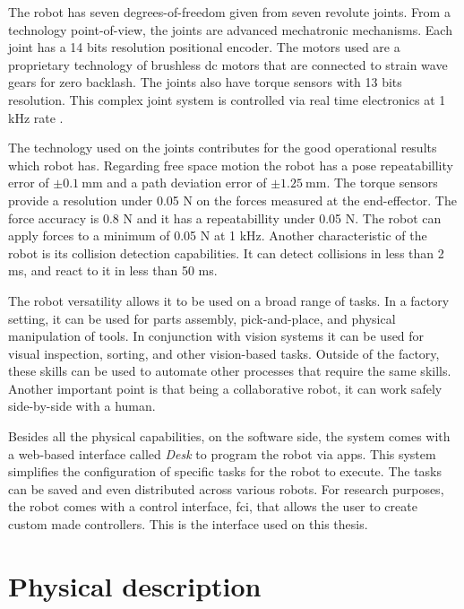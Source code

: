 The robot has seven degrees-of-freedom given from seven revolute joints. From a technology point-of-view, the joints are advanced mechatronic mechanisms. Each joint has a 14 bits resolution positional encoder. The motors used are a proprietary technology of brushless dc motors that are connected to strain wave gears for zero backlash. The joints also have torque sensors with 13 bits resolution. This complex joint system is controlled via real time electronics at 1 kHz rate \cite{FrankaEmikaGmbH_technology}.

The technology used on the joints contributes for the good operational results which robot has. Regarding free space motion the robot has a pose repeatabillity error of $\pm \SI{0.1}{\milli\meter}$ and a path deviation error of $\pm \SI{1.25}{\milli\meter}$. The torque sensors provide a resolution under 0.05 N on the forces measured at the end-effector. The force accuracy is 0.8 N and it has a repeatabillity under 0.05 N. The robot can apply forces to a minimum of 0.05 N at 1 kHz. Another characteristic of the robot is its collision detection capabilities. It can detect collisions in less than 2 ms, and react to it in less than 50 ms.

The robot versatility allows it to be used on a broad range of tasks. In a factory setting, it can be used for parts assembly, pick-and-place, and physical manipulation of tools. In conjunction with vision systems it can be used for visual inspection, sorting, and other vision-based tasks. Outside of the factory, these skills can be used to automate other processes that require the same skills. Another important point is that being a collaborative robot, it can work safely side-by-side with a human.

Besides all the physical capabilities, on the software side, the system comes with a web-based interface called \emph{Desk} to program the robot via apps. This system simplifies the configuration of specific tasks for the robot to execute. The tasks can be saved and even distributed across various robots. For research purposes, the robot comes with a control interface, \gls{fci}, that allows the user to create custom made controllers. This is the interface used on this thesis.



\section{Physical description}
\label{sec:robotic_system_physical_description}

